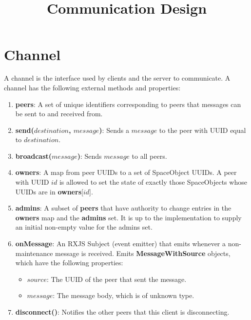 \documentclass{article}
\title{Communication Design}
\begin{document}
\maketitle

\section{Channel}
A channel is the interface used by clients and the server to communicate. A channel has the following external methods and properties:
\begin{enumerate}
\item \textbf{peers}: A set of unique identifiers corresponding to peers that messages can be sent to and received from.
\item \textbf{send($destination$, $message$)}: Sends a $message$ to the peer with UUID equal to $destination$.
\item \textbf{broadcast($message$)}: Sends $message$ to all peers.
\item \textbf{owners}: A map from peer UUIDs to a set of SpaceObject UUIDs. A peer with UUID $id$ is allowed to set the state of exactly those SpaceObjects whose UUIDs are in \textbf{owners}[$id$].
\item \textbf{admins}: A subset of \textbf{peers} that have authority to change entries in the \textbf{owners} map and the \textbf{admins} set. It is up to the implementation to supply an initial non-empty value for the admins set.
\item \textbf{onMessage}: An RXJS Subject (event emitter) that emits whenever a non-maintenance message is received. Emits \textbf{MessageWithSource} objects, which have the following properties:
  \begin{itemize}
  \item $source$: The UUID of the peer that sent the message.
  \item $message$: The message body, which is of unknown type.
  \end{itemize}
  
\item \textbf{disconnect()}: Notifies the other peers that this client is disconnecting.
\end{enumerate}
\end{document}

